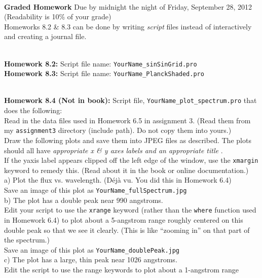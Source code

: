 \documentclass{article}
\begin{document}
\begin{spacing}{1.0}
  \par \\ 
  \textbf{Graded Homework} Due by midnight the night of Friday, September 28, 2012    \\ 
  (Readability is 10\% of your grade) \\ 
  Homeworks 8.2 \& 8.3 can be done by writing  \emph{script}  files instead of
  interactively and creating a journal file. \\ 
  \par \\ 
  \textbf{Homework 8.2:}  Script file name:  \verb|YourName_sinSinGrid.pro| \\ 
  \textbf{Homework 8.3:}  Script file name:  \verb|YourName_PlanckShaded.pro| \\ 
  \par \\ 
  \textbf{Homework 8.4 (Not in book):}  Script file,
  \verb|YourName_plot_spectrum.pro|  that does the following: \\ 
  Read in the data files used in Homework 6.5 in assignment 3.   (Read them
  from my  \verb|assignment3|  directory (include path).   Do not copy them
  into yours.) \\ 
  Draw the following plots and save them into JPEG files as described.   The
  plots should all have  \emph{appropriate x \& y axes labels and an
  appropriate title} . \\ 
  If the yaxis label appears clipped off the left edge of the window, use the
  \verb|xmargin|  keyword to remedy this.   (Read about it in the book or
  online documentation.) \\ 
  a) Plot the flux vs. wavelength.   (Déjà vu.   You did this in Homework 6.4) \\ 
  Save an image of this plot as  \verb|YourName_fullSpectrum.jpg| \\ 
  b) The plot has a double peak near 990 angstroms.    \\ 
  Edit your script to use the  \verb|xrange|  keyword (rather than the
  \verb|where|  function used in Homework 6.4) to plot about a 5-angstrom range
  roughly centered on this double peak so that we see it clearly.   (This is
  like “zooming in” on that part of the spectrum.) \\ 
  Save an image of this plot as  \verb|YourName_doublePeak.jpg| \\ 
  c) The plot has a large, thin peak near 1026 angstroms. \\ 
  Edit the script to use the range keywords to plot about a 1-angstrom range

\end{spacing}
\end{document}

